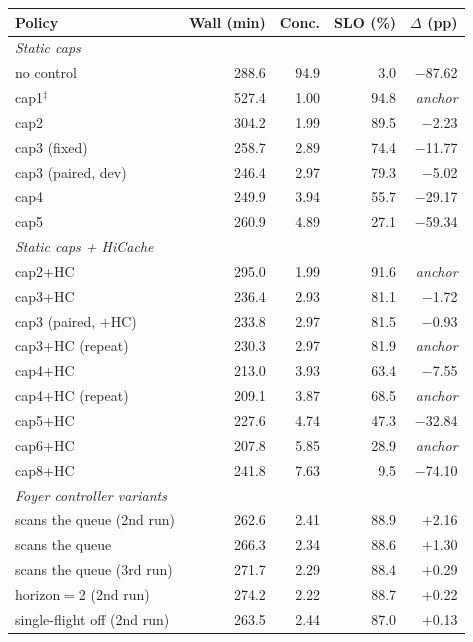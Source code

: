 \documentclass[10pt]{article}
\newcommand{\sys}{Foyer}
\begin{document}
\begin{tabular}{lrrrr}
    \toprule
    Policy & Wall (min) & Conc. & SLO (\%) & $\Delta$ (pp) \\
    \midrule
    \multicolumn{5}{l}{\emph{Static caps}}\\
    no control        & 288.6 & 94.9 & 3.0 & $-$87.62 \\
    cap1$^\ddagger$   & 527.4 & 1.00 & 94.8 & \emph{anchor} \\
    cap2              & 304.2 & 1.99 & 89.5 & $-$2.23 \\
    cap3 (fixed)      & 258.7 & 2.89 & 74.4 & $-$11.77 \\
    cap3 (paired, dev) & 246.4 & 2.97 & 79.3 & $-$5.02 \\
    cap4              & 249.9 & 3.94 & 55.7 & $-$29.17 \\
    cap5              & 260.9 & 4.89 & 27.1 & $-$59.34 \\
    \midrule
    \multicolumn{5}{l}{\emph{Static caps + HiCache}}\\
    cap2+HC           & 295.0 & 1.99 & 91.6 & \emph{anchor} \\
    cap3+HC           & 236.4 & 2.93 & 81.1 & $-$1.72 \\
    cap3 (paired, +HC) & 233.8 & 2.97 & 81.5 & $-$0.93 \\
    cap3+HC (repeat)  & 230.3 & 2.97 & 81.9 & \emph{anchor} \\
    cap4+HC           & 213.0 & 3.93 & 63.4 & $-$7.55 \\
    cap4+HC (repeat)  & 209.1 & 3.87 & 68.5 & \emph{anchor} \\
    cap5+HC           & 227.6 & 4.74 & 47.3 & $-$32.84 \\
    cap6+HC           & 207.8 & 5.85 & 28.9 & \emph{anchor} \\
    cap8+HC           & 241.8 & 7.63 & 9.5 & $-$74.10 \\
    \midrule
    \multicolumn{5}{l}{\emph{\sys{} controller variants}}\\
    scans the queue (2nd run) & 262.6 & 2.41 & 88.9 & $+$2.16 \\
    scans the queue   & 266.3 & 2.34 & 88.6 & $+$1.30 \\
    scans the queue (3rd run) & 271.7 & 2.29 & 88.4 & $+$0.29 \\
    horizon$=$2 (2nd run) & 274.2 & 2.22 & 88.7 & $+$0.22 \\
    single-flight off (2nd run) & 263.5 & 2.44 & 87.0 & $+$0.13 \\

\end{tabular}
\end{document}
